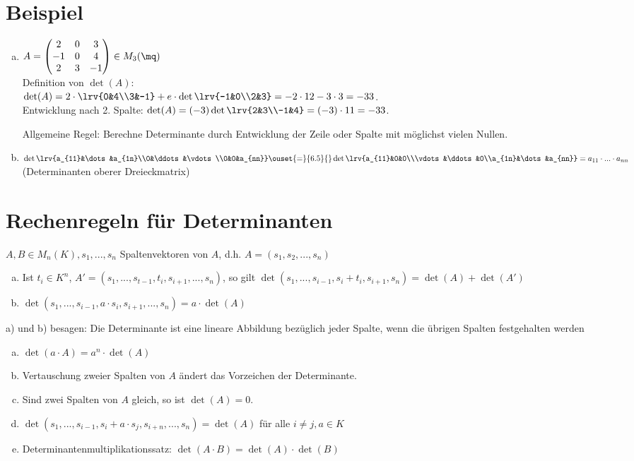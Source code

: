 \section{Beispiel}
  \begin{enumerate}[a)]
    \item $A=\begin{pmatrix}2&0&3\\-1&0&4\\2&3&-1\end{pmatrix}\in M_3(\mq)$\\
      Definition von $\det(A)$:\\
      $\det(A)=2\cdot\lrv{0&4\\3&-1}+e\cdot\det\lrv{-1&0\\2&3}=-2\cdot
      12-3\cdot 3=-33$.\\ Entwicklung nach 2. Spalte:
      $\det(A)=(-3)\det\lrv{2&3\\-1&4}=(-3)\cdot 11=-33$.

      Allgemeine Regel: Berechne Determinante durch Entwicklung der Zeile oder
      Spalte mit möglichst vielen Nullen.

    \item
      $\det\lrv{a_{11}&\dots&a_{1n}\\0&\ddots&\vdots\\0&0&a_{nn}}\ouset{=}{6.5}{}\det\lrv{a_{11}&0&0\\\vdots&\ddots&0\\a_{1n}&\dots&a_{nn}}=a_{11}\cdot...\cdot a_{nn}$\\
      (Determinanten oberer Dreieckmatrix)
  \end{enumerate}
\section{Rechenregeln für Determinanten}
  $A,B\in M_n(K),s_1,...,s_n$ Spaltenvektoren von $A$, d.h. $A=(s_1,s_2,...,s_n)$
  \begin{enumerate}[a)]
    \item Ist $t_i\in K^n$, $A'=(s_1,...,s_{t-1},t_i,s_{i+1},...,s_n)$, so gilt
      $\det(s_1,...,s_{i-1},s_i+t_i,s_{i+1},s_n)=\det(A)+\det(A')$
    \item $\det(s_1,...,s_{i-1},a\cdot s_i,s_{i+1},...,s_n)=a\cdot\det(A)$
  \end{enumerate}
  a) und b) besagen: Die Determinante ist eine lineare Abbildung bezüglich
  jeder Spalte, wenn die übrigen Spalten festgehalten werden
  \begin{enumerate}[c)]
    \item $\det(a\cdot A)=a^n\cdot\det(A)$
    \item Vertauschung zweier Spalten von $A$ ändert das Vorzeichen der
      Determinante.
    \item Sind zwei Spalten von $A$ gleich, so ist $\det(A)=0$.
    \item $\det(s_1,...,s_{i-1},s_i+a\cdot s_j,s_{i+n},...,s_n)=\det(A)$ für
      alle $i\neq j,a\in K$
    \item Determinantenmultiplikationssatz: $\det(A\cdot
      B)=\det(A)\cdot\det(B)$
  \end{enumerate}

